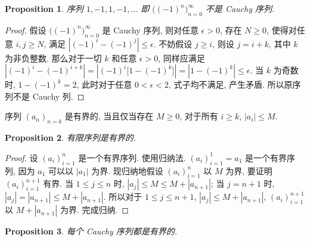 \documentclass[UTF8]{ctexart}
\theoremstyle{mystyle}
\newtheorem{proposition}{Proposition}[section]
\theoremstyle{myremark}
\theoremstyle{plain}
\begin{document}
\begin{proposition} \label{1-1}
    序列 $ 1, -1, 1, -1, \dots $ 即 $ \big( (-1)^n \big)_{n = 0}^\infty $ 不是 Cauchy 序列. 
\end{proposition}

\begin{proof}
    假设 $ \big( (-1)^n \big)_{n = 0}^\infty $ 是 Cauchy 序列, 则对任意 $ \epsilon > 0 $, 存在 $ N \geqslant 0 $, 使得对任意 $ i, j \geqslant N $, 满足 $ \left| (-1)^i - (-1)^j \right| \leqslant \epsilon $. 不妨假设 $ j \geqslant i $, 则设 $ j = i + k $, 其中 $ k $ 为非负整数. 那么对于一切 $ k $ 和任意 $ \epsilon > 0 $, 同样应满足 $ \left| (-1)^i - (-1)^{i + k} \right| = \left| (-1)^i \big[ 1 - (-1)^k \big] \right| = \left| 1 - (-1)^k \right| \leqslant \epsilon $. 当 $ k $ 为奇数时, $ 1 - (-1)^k = 2 $, 此时对于任意 $ 0 < \epsilon < 2 $, 式子均不满足, 产生矛盾. 所以原序列不是 Cauchy 列.
\end{proof}

\begin{definition}
    序列 $ (a_n)_{n = k} $ 是有界的, 当且仅当存在 $ M \geqslant 0 $, 对于所有 $ i \geqslant k $, $ |a_i| \leqslant M $.
\end{definition}

\begin{proposition} \label{s}
    有限序列是有界的.
\end{proposition}

\begin{proof} \label{finite bounded}
    设 $ (a_i)_{i = 1}^n $ 是一个有界序列. 使用归纳法. $ (a_i)_{i = 1}^1 = a_1 $ 是一个有界序列, 因为 $ a_1 $ 可以以 $ |a_1| $ 为界. 现归纳地假设 $ (a_i)_{i = 1}^n $ 以 $ M $ 为界, 要证明 $ (a_i)_{i = 1}^{n + 1} $ 有界. 当 $ 1 \leqslant j \leqslant n $ 时, $ |a_j| \leqslant M \leqslant M + |a_{n+1}| $; 当 $ j = n + 1 $ 时, $ |a_j| = |a_{n+1}| \leqslant M + |a_{n+1}| $. 所以对于 $ 1 \leqslant j \leqslant n + 1 $, $ |a_j| \leqslant M + |a_{n+1}| $, $ (a_i)_{i = 1}^{n + 1} $ 以 $ M + |a_{n + 1}| $ 为界. 完成归纳. 
\end{proof}

\begin{proposition}
    每个 Cauchy 序列都是有界的.
\end{proposition}
\end{document}
